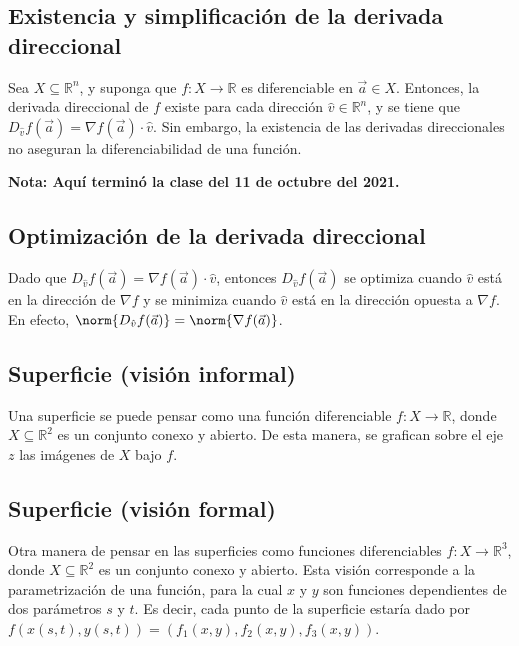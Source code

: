 \documentclass{article}
\begin{document}
\subsection*{Existencia y simplificación de la derivada direccional}

Sea $X\subseteq\mathbb{R}^n$, y suponga que $f:X\to\mathbb{R}$ es diferenciable en $\vec{a}\in X$. Entonces, la derivada direccional de $f$ existe para cada dirección $\hat{v}\in\mathbb{R}^n$, y se tiene que $D_{\hat{v}}f(\vec{a})=\nabla f(\vec{a})\cdot\hat{v}$. Sin embargo, la existencia de las derivadas direccionales no aseguran la diferenciabilidad de una función.

\vspace{10pt}
\textbf{Nota: Aquí terminó la clase del 11 de octubre del 2021.}

\subsection*{Optimización de la derivada direccional}

Dado que $D_{\hat{v}}f(\vec{a})=\nabla f(\vec{a})\cdot\hat{v}$, entonces $D_{\hat{v}}f(\vec{a})$ se optimiza cuando $\hat{v}$ está en la dirección de $\nabla f$ y se minimiza cuando $\hat{v}$ está en la dirección opuesta a $\nabla f$. En efecto, $\norm{D_{\hat{v}}f(\vec{a})}=\norm{\nabla f(\vec{a})}$.

\subsection*{Superficie (visión informal)}

Una superficie se puede pensar como una función diferenciable $f:X\to\mathbb{R}$, donde $X\subseteq\mathbb{R}^2$ es un conjunto conexo y abierto. De esta manera, se grafican sobre el eje $z$ las imágenes de $X$ bajo $f$.

\subsection*{Superficie (visión formal)}

Otra manera de pensar en las superficies como funciones diferenciables $f:X\to\mathbb{R}^3$, donde $X\subseteq\mathbb{R}^2$ es un conjunto conexo y abierto. Esta visión corresponde a la parametrización de una función, para la cual $x$ y $y$ son funciones dependientes de dos parámetros $s$ y $t$. Es decir, cada punto de la superficie estaría dado por $f(x(s,t),y(s,t))=(f_1(x,y),f_2(x,y),f_3(x,y))$.
\end{document}
